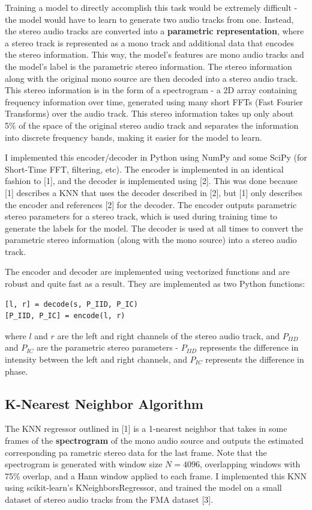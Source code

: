 \documentclass{article}
\begin{document}
Training a model to directly accomplish this task would be extremely difficult - the model would have to learn to generate two audio tracks from one. Instead, the stereo audio tracks are converted into a \textbf{parametric representation}, where a stereo track is represented as a mono track and additional data that encodes the stereo information. This way, the model's features are mono audio tracks and the model's label is the parametric stereo information. The stereo information along with the original mono source are then decoded into a stereo audio track. This stereo information is in the form of a spectrogram - a 2D array containing frequency information over time, generated using many short FFTs (Fast Fourier Transforms) over the audio track. This stereo information takes up only about 5\% of the space of the original stereo audio track and separates the information into discrete frequency bands, making it easier for the model to learn.

I implemented this encoder/decoder in Python using NumPy and some SciPy (for Short-Time FFT, filtering, etc). The encoder is implemented in an identical fashion to [1], and the decoder is implemented using [2]. This was done because [1] describes a KNN that uses the decoder described in [2], but [1] only describes the encoder and references [2] for the decoder. The encoder outputs parametric stereo parameters for a stereo track, which is used during training time to generate the labels for the model. The decoder is used at all times to convert the parametric stereo information (along with the mono source) into a stereo audio track.

The encoder and decoder are implemented using vectorized functions and are robust and quite fast as a result. They are implemented as two Python functions:

\begin{verbatim}
[l, r] = decode(s, P_IID, P_IC)
[P_IID, P_IC] = encode(l, r)
\end{verbatim}

where $l$ and $r$ are the left and right channels of the stereo audio track, and $P_{IID}$ and $P_{IC}$ are the parametric stereo parameters - $P_{IID}$ represents the difference in intensity between the left and right channels, and $P_{IC}$ represents the difference in phase.

\subsection{K-Nearest Neighbor Algorithm}
The KNN regressor outlined in [1] is a 1-nearest neighbor that takes in some frames of the \textbf{spectrogram} of the mono audio source and outputs the estimated corresponding pa rametric stereo data for the last frame. Note that the spectrogram is generated with window size $N=4096$, overlapping windows with 75\% overlap, and a Hann window applied to each frame. I implemented this KNN using scikit-learn's KNeighborsRegressor, and trained the model on a small dataset of stereo audio tracks from the FMA dataset [3].
\end{document}
